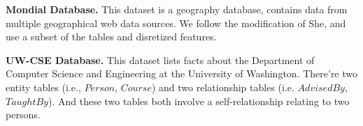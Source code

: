 \documentclass{vldb}
\begin{document}



\noindent\textbf{Mondial Database.} %
This dataset is a geography database, contains data from multiple geographical web data sources. 
We follow the modification of She\cite{wangMondial}, and use a subset of the tables and disretized features. %


\noindent\textbf{UW-CSE Database.}
This dataset lists facts about the Department of Computer Science and Engineering at the University of Washington\cite{Domingos2007}. There're two entity  tables (i.e., $Person$, $Course$) and two relationship tables (i.e. $AdvisedBy$, $TaughtBy$). And these two tables both involve a self-relationship relating to two persons. 
\end{document}
